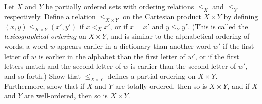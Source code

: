 \begin{ex}\label{ex:8.5.12}
  Let \(X\) and \(Y\) be partially ordered sets with ordering relations \(\leq_X\) and \(\leq_Y\) respectively.
  Define a relation \(\leq_{X \times Y}\) on the Cartesian product \(X \times Y\) by defining \((x, y) \leq_{X \times Y} (x', y')\) if \(x <_X x'\), or if \(x = x'\) and \(y \leq_Y y'\).
  (This is called the \emph{lexicographical ordering} on \(X \times Y\), and is similar to the alphabetical ordering of words;
  a word \(w\) appears earlier in a dictionary than another word \(w'\) if the first letter of \(w\) is earlier in the alphabet than the first letter of \(w'\), or if the first letters match and the second letter of \(w\) is earlier than the second letter of \(w'\), and so forth.)
  Show that \(\leq_{X \times Y}\) defines a partial ordering on \(X \times Y\).
  Furthermore, show that if \(X\) and \(Y\) are totally ordered, then so is \(X \times Y\), and if \(X\) and \(Y\) are well-ordered, then so is \(X \times Y\).
\end{ex}

